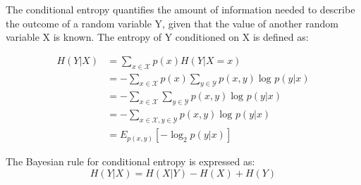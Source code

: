  The conditional entropy quantifies the amount of information needed to describe the outcome of a random variable Y, given that the value of another random variable X is known. The entropy of Y conditioned on X is defined as:
 

\begin{equation}
\begin{split}
H(Y|X) &= \sum_{x\in \mathcal{X}}p(x)H(Y|X = x) \\
&= -\sum_{x\in \mathcal{X}}p(x)\sum_{y\in \mathcal{Y}}p(x,y)\log_{}{p(y|x)} \\
&= -\sum_{x\in \mathcal{X}}\sum_{y\in \mathcal{Y}}p(x,y)\log_{}{p(y|x)}   \\
&= -\sum_{x\in \mathcal{X},y\in \mathcal{Y}}p(x,y)\log_{}{p(y|x)}  \\ 
&= E_{p(x,y)}\left [ -\log_{2}{p(y|x)}  \right ]  
\end{split}
\end{equation}

The Bayesian rule for conditional entropy is expressed as:
\begin{equation}
H(Y|X) = H(X|Y) - H(X) + H(Y)
\end{equation}

